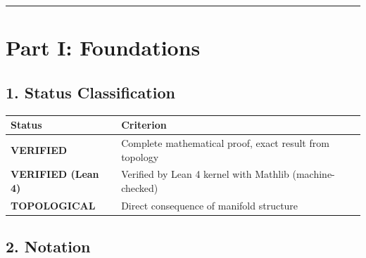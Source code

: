 \documentclass[11pt,a4paper]{article}
\begin{document}
\begin{center}\rule{0.5\linewidth}{0.5pt}\end{center}

\section{Part I: Foundations}\label{part-i-foundations}

\subsection{1. Status Classification}\label{status-classification}

{\def\LTcaptype{none} %
\begin{longtable}[]{@{}
  >{\raggedright\arraybackslash}p{}
  >{\raggedright\arraybackslash}p{}@{}}
\toprule\noalign{}
\begin{minipage}[b]{\linewidth}\raggedright
Status
\end{minipage} & \begin{minipage}[b]{\linewidth}\raggedright
Criterion
\end{minipage} \\
\midrule\noalign{}
\endhead
\bottomrule\noalign{}
\endlastfoot
\textbf{VERIFIED} & Complete mathematical proof, exact result from topology \\
\textbf{VERIFIED (Lean 4)} & Verified by Lean 4 kernel with Mathlib (machine-checked) \\
\textbf{TOPOLOGICAL} & Direct consequence of manifold structure \\
\end{longtable}
}

\subsection{2. Notation}\label{notation}
\end{document}
